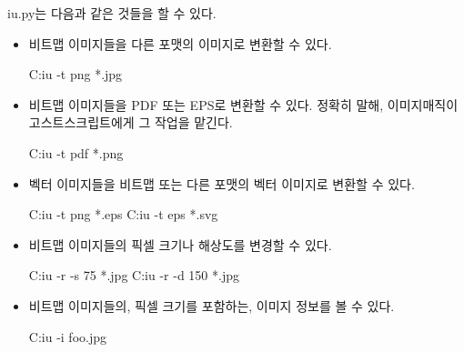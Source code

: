 iu.py는 다음과 같은 것들을 할 수 있다.

\begin{itemize}

\item 비트맵 이미지들을 다른 포맷의 이미지로 변환할 수 있다.

\begin{code}
C:\>iu -t png *.jpg
\end{code}

\item 비트맵 이미지들을 PDF 또는 EPS로 변환할 수 있다.
정확히 말해, 이미지매직이 고스트스크립트에게 그 작업을 맡긴다.

\begin{code}
C:\>iu -t pdf *.png
\end{code}

\item 벡터 이미지들을 비트맵 또는 다른 포맷의 벡터 이미지로 변환할 수 있다.

\begin{code}
C:\>iu -t png *.eps
C:\>iu -t eps *.svg
\end{code}

\item 비트맵 이미지들의 픽셀 크기나 해상도를 변경할 수 있다.

\begin{code}
C:\>iu -r -s 75 *.jpg
C:\>iu -r -d 150 *.jpg
\end{code}

\item 비트맵 이미지들의, 픽셀 크기를 포함하는, 이미지 정보를 볼 수 있다.

\begin{code}
C:\>iu -i foo.jpg
\end{code}
\end{itemize}

